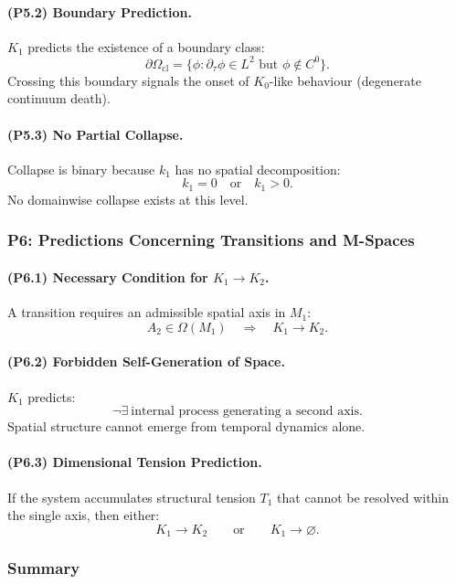 \paragraph{(P5.2) Boundary Prediction.}
$K_1$ predicts the existence of a boundary class:
\[
\partial\Omega_{\mathrm{cl}} =
\{ \phi : \partial_\tau \phi \in L^2 \text{ but } \phi \notin C^0 \}.
\]
Crossing this boundary signals the onset of $K_0$-like behaviour (degenerate
continuum death).

\paragraph{(P5.3) No Partial Collapse.}
Collapse is binary because $k_1$ has no spatial decomposition:
\[
k_1 = 0\quad \text{or}\quad k_1 > 0.
\]
No domainwise collapse exists at this level.

\subsubsection{P6: Predictions Concerning Transitions and M-Spaces}

\paragraph{(P6.1) Necessary Condition for \texorpdfstring{$K_1 \to K_2$}{K_1 \to K_2}.}
A transition requires an admissible spatial axis in $M_1$:
\[
A_2 \in \Omega(M_1)
\quad\Rightarrow\quad K_1\to K_2.
\]

\paragraph{(P6.2) Forbidden Self-Generation of Space.}
$K_1$ predicts:
\[
\neg\exists\ \text{internal process generating a second axis}.
\]
Spatial structure cannot emerge from temporal dynamics alone.

\paragraph{(P6.3) Dimensional Tension Prediction.}
If the system accumulates structural tension $T_1$ that cannot be resolved
within the single axis, then either:
\[
K_1 \rightarrow K_2
\qquad\text{or}\qquad
K_1 \rightarrow \varnothing.
\]

\subsubsection{Summary}

